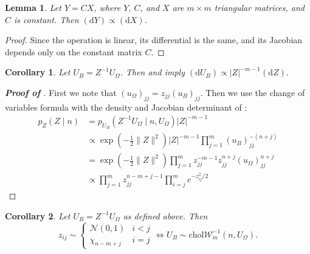 \documentclass[12pt,a4paper,reqno]{amsart}
\numberwithin{equation}{section}
\newtheorem{lemma}{Lemma}[section]
\newtheorem{corollary}{Corollary}[section]
\newcommand{\cholinvwishart}[1]{\mathrm{chol}\mathcal{W}^{-1}_{#1}}
\renewcommand{\det}[1]{\left| {#1} \right|}
\newcommand{\dmeasure}[1]{\left(\dd{#1}\right)}
\newcommand{\dd}[1]{\mathrm{d}{#1}}
\begin{document}
\begin{lemma}\label{lem:trimuldetjac}
    Let $Y = C X$, where $Y$, $C$, and $X$ are $m \times m$ triangular matrices, and $C$ is constant.
    Then $\dmeasure{Y} \propto \dmeasure{X}$.
\end{lemma}
\begin{proof}
    Since the operation is linear, its differential is the same, and its Jacobian depends only on the constant matrix $C$.
\end{proof}

\begin{corollary}
    Let $U_B = Z^{-1} U_\Omega$.
    Then  and  imply $\dmeasure{U_B} \propto \det{Z}^{-m-1} \dmeasure{Z}$.
\end{corollary}

\begin{proof}[\textbf{Proof of }]
    First we note that $(u_\Omega)_{jj} = z_{jj} (u_B)_{jj}$.
    Then we use the change of variables formula with the density  and Jacobian determinant of :
    \begin{align*}
        p_Z(Z \mid n) & = p_{U_B}(Z^{-1} U_\Omega \mid n, U_\Omega) \det{Z}^{-m-1}                                                      \\
                      & \propto \exp\left(-\frac{1}{2}\lVert Z \rVert^2\right) \det{Z}^{-m-1} \prod_{j=1}^m (u_B)_{jj}^{-(n+j)}         \\
                      & = \exp\left(-\frac{1}{2}\lVert Z \rVert^2\right) \prod_{j=1}^m z_{jj}^{-m-1} z_{jj}^{n+j} (u_\Omega)_{jj}^{n+j} \\
                      & \propto \prod_{j=1}^m z_{jj}^{n-m+j-1} \prod_{i=j}^m e^{-z_{ij}^2/2}
    \end{align*}
\end{proof}

\begin{corollary}\label{cor:invwishartbartlett}
    Let $U_B = Z^{-1} U_\Omega$ as defined above.
    Then
    \begin{equation}
        z_{ij} \sim \begin{cases}\mathcal{N}(0, 1) & i < j\\ \chi_{n-m+j} & i = j\end{cases} \iff U_B \sim \cholinvwishart{m}(n, U_\Omega).
    \end{equation}
\end{corollary}
\end{document}
